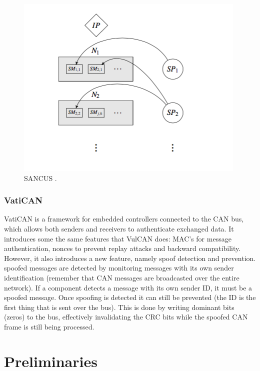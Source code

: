 \documentclass[master=cws,masteroption=vs,english]{kulemt}
\begin{document}
\begin{figure}[h]
	\label{fig:SANCUS}
	\centering
	\includegraphics[width=\textwidth]{SANCUS.png}
	\caption{SANCUS \cite{MillerC}.}
\end{figure} 

\subsubsection{VatiCAN} VatiCAN is a framework for embedded controllers connected to the CAN bus, which allows both senders and receivers to authenticate exchanged data. It introduces some the same features that VulCAN does: MAC's for message authentication, nonces to prevent replay attacks and backward compatibility. However, it also introduces a new feature, namely spoof detection and prevention. spoofed messages are detected by monitoring messages with its own sender identification (remember that CAN messages are broadcasted over the entire network). If a component detects a message with its own sender ID, it must be a spoofed message. Once spoofing is detected it can still be prevented (the ID is the first thing that is sent over the bus). This is done by writing dominant bits (zeros) to the bus, effectively invalidating the CRC bits while the spoofed CAN frame is still being processed.\cite{VatiCAN}

\section{Preliminaries}
\label{sec:preliminaries}
\end{document}
